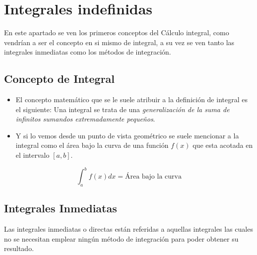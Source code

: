 \documentclass[../main]{subfiles}
\begin{document}
\section{Integrales indefinidas}
En este apartado se ven los primeros conceptos del Cálculo integral, como vendrían a ser el concepto en si mismo de integral, a su vez se ven tanto las integrales inmediatas como los métodos de integración.
\subsection*{Concepto de Integral}
\begin{itemize}
    \item El concepto matemático que se le suele atribuir a la definición de integral es el siguiente: Una integral se trata de una \textit{generalización de la suma de infinitos sumandos extremadamente pequeños}.
    \item Y si lo vemos desde un punto de vista geométrico se suele mencionar a la integral como el área bajo la curva de una función $f(x)$ que esta acotada en el intervalo $[a,b]$.
\end{itemize}
\begin{equation}
    \int_a^b f(x)dx=\text{Área bajo la curva}
\end{equation}
\subsection*{Integrales Inmediatas}
Las integrales inmediatas o directas están referidas a aquellas integrales las cuales no se necesitan emplear ningún método de integración para poder obtener su resultado.
\end{document}
